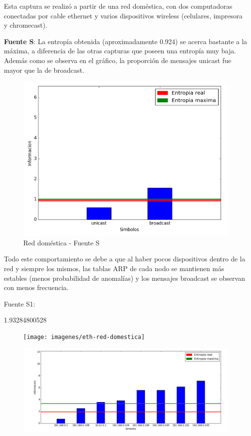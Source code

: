 Esta captura se realizó a partir de una red doméstica, con dos computadoras conectadas por cable ethernet y varios dispositivos wireless (celulares, impresora y chromecast).

\textbf{Fuente S}:
La entropía obtenida (aproximadamente 0.924) se acerca bastante a la máxima, a diferencia de las otras capturas que poseen una entropía muy baja. Además como se observa en el gráfico, la proporción de mensajes unicast fue mayor que la de broadcast.	

\begin{figure}[h]
\centering
\includegraphics[width=0.7\linewidth]{imagenes/red-dom-S}
\caption{Red doméstica - Fuente S}
\label{fig:red-dom-S}
\end{figure}

Todo este comportamiento se debe a que al haber pocos dispositivos dentro de la red y siempre los mismos, las tablas ARP de cada nodo se mantienen más estables (menos probabilidad de anomalías) y los mensajes broadcast se observan con menos frecuencia.

Fuente S1:

1.93284800528

\begin{figure}[h]
\centering
\texttt{[image: imagenes/eth-red-domestica]}
\caption{}
\label{fig:eth-red-domestica}
\end{figure}

\begin{figure}[h]
\centering
\includegraphics[width=0.7\linewidth]{imagenes/red-dom-S1}
\caption{}
\label{fig:red-dom-S1}
\end{figure}
